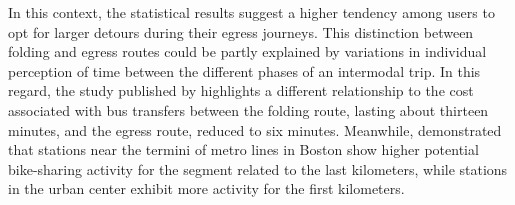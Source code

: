 \begin{refsegment}
In this context, the statistical results suggest a higher tendency among users to opt for larger detours during their egress journeys. This distinction between folding and egress routes could be partly explained by variations in individual \gls{perception} of time between the different phases of an intermodal trip. In this regard, the study published by \textcolor{blue}{\textcite[79]{schakenbos_valuation_2016}} highlights a different relationship to the cost associated with bus transfers between the folding route, lasting about thirteen minutes, and the egress route, reduced to six minutes. Meanwhile, \textcolor{blue}{\textcite[3]{romm_differences_2022}} demonstrated that stations near the termini of metro lines in Boston show higher potential bike-sharing activity for the segment related to the last kilometers, while stations in the urban center exhibit more activity for the first kilometers.%


\end{refsegment}

